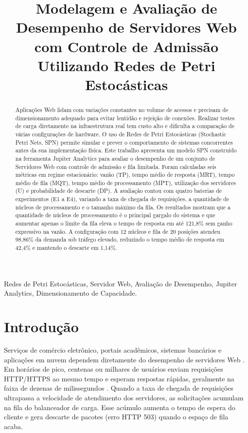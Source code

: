 \documentclass[conference,10pt]{IEEEtran}
\begin{document}
\title{Modelagem e Avaliação de Desempenho de Servidores Web com Controle de Admissão Utilizando Redes de Petri Estocásticas}

\author{
}

\maketitle

\begin{abstract}
Aplicações Web lidam com variações constantes no volume de acessos e precisam de dimensionamento adequado para evitar lentidão e rejeição de conexões. Realizar testes de carga diretamente na infraestrutura real tem custo alto e dificulta a comparação de várias configurações de hardware. O uso de Redes de Petri Estocásticas (Stochastic Petri Nets, SPN) permite simular e prever o comportamento de sistemas concorrentes antes da sua implementação física. Este trabalho apresenta um modelo SPN construído na ferramenta Jupiter Analytics para avaliar o desempenho de um conjunto de Servidores Web com controle de admissão e fila limitada. Foram calculadas seis métricas em regime estacionário: vazão (TP), tempo médio de resposta (MRT), tempo médio de fila (MQT), tempo médio de processamento (MPT), utilização dos servidores (U) e probabilidade de descarte (DP). A avaliação contou com quatro baterias de experimentos (E1 a E4), variando a taxa de chegada de requisições, a quantidade de núcleos de processamento e o tamanho máximo da fila. Os resultados mostram que a quantidade de núcleos de processamento é o principal gargalo do sistema e que aumentar apenas o limite da fila eleva o tempo de resposta em até 121,8\% sem ganho expressivo na vazão. A configuração com 12 núcleos e fila de 20 posições atendeu 98,86\% da demanda sob tráfego elevado, reduzindo o tempo médio de resposta em 42,4\% e mantendo o descarte em 1,14\%.
\end{abstract}

\begin{IEEEkeywords}
Redes de Petri Estocásticas, Servidor Web, Avaliação de Desempenho, Jupiter Analytics, Dimensionamento de Capacidade.
\end{IEEEkeywords}

\section{Introdução}
Serviços de comércio eletrônico, portais acadêmicos, sistemas bancários e aplicações em nuvem dependem diretamente do desempenho de servidores Web \cite{menasce2002}. Em horários de pico, centenas ou milhares de usuários enviam requisições HTTP/HTTPS ao mesmo tempo e esperam respostas rápidas, geralmente na faixa de dezenas de milissegundos \cite{cao2003}. Quando a taxa de chegada de requisições ultrapassa a velocidade de atendimento dos servidores, as solicitações acumulam na fila do balanceador de carga. Esse acúmulo aumenta o tempo de espera do cliente e gera descarte de pacotes (erro HTTP 503) quando o espaço de fila acaba.
\end{document}
